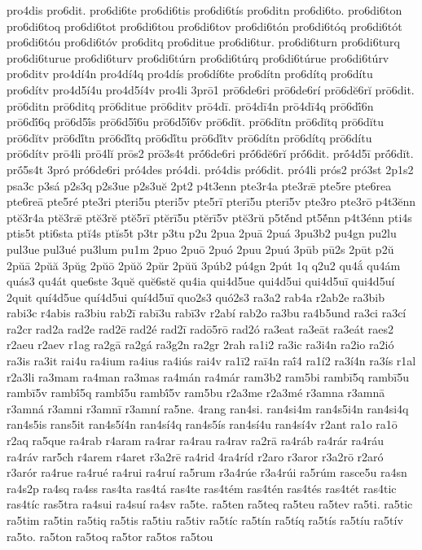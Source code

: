 {pro4dis
pro6dit.
pro6di6te
pro6di6tis
pro6di6tís
pro6ditn
pro6di6to.
pro6di6ton
pro6di6toq
pro6di6tot
pro6di6tou
pro6di6tov
pro6di6tón
pro6di6tóq
pro6di6tót
pro6di6tóu
pro6di6tóv
pro6ditq
pro6ditue
pro6di6tur.
pro6di6turn
pro6di6turq
pro6di6turue
pro6di6turv
pro6di6túrn
pro6di6túrq
pro6di6túrue
pro6di6túrv
pro6ditv
pro4dí4n
pro4dí4q
pro4dís
pro6dí6te
pro6dítn
pro6dítq
pro6dítu
pro6dítv
pro4d5í4u
pro4d5í4v
pro4li
3prō1
prō6de6ri
prō6de6rí
prō6dĕ6rĭ
prō6dit.
prō6ditn
prō6ditq
prō6ditue
prō6ditv
prō4dī.
prō4dī4n
prō4dī4q
prō6dī́6n
prō6dī́6q
prō6d5ī́s
prō6d5ī́6u
prō6d5ī́6v
prō6dĭt.
prō6dĭtn
prō6dĭtq
prō6dĭtu
prō6dĭtv
prō6dĭ́tn
prō6dĭ́tq
prō6dĭ́tu
prō6dĭ́tv
prō6dítn
prō6dítq
prō6dítu
prō6dítv
prō4li
prō4lĭ
prōs2
prō3s4t
prṓ6de6ri
prṓ6dĕ6rĭ
prṓ6dit.
prṓ4d5ī
prṓ6dĭt.
prṓ5s4t
3pró
pró6de6ri
pró4des
pró4di.
pró4dis
pró6dit.
pró4li
prós2
pró3st
2p1s2
psa3c
p3sá
p2s3q
p2s3ue
p2s3uĕ
2pt2
p4t3enn
pte3r4a
pte3rǣ
pte5re
pte6rea
pte6reā
pte5ré
pte3ri
pteri5u
pteri5v
pte5rī
pterī5u
pterī5v
pte3ro
pte3rō
p4t3ĕnn
ptĕ3r4a
ptĕ3rǣ
ptĕ3rĕ
ptĕ5rī
ptĕrī5u
ptĕrī5v
ptĕ3rŭ
p5tĕ́nd
pt5ĕ́nn
p4t3énn
pti4s
ptis5t
pti6sta
ptĭ4s
ptĭs5t
p3tr
p3tu
p2u
2pua
2puā
2puá
3pu3b2
pu4gn
pu2lu
pul3ue
pul3ué
pu3lum
pu1m
2puo
2puō
2puó
2puu
2puú
3pūb
pū2s
2pūt
p2ŭ
2pŭā
2pŭă
3pŭg
2pŭō
2pŭŏ
2pŭr
2pŭŭ
3púb2
pú4gn
2pút
1q
q2u2
qu4ắ
qu4ám
quás3
qu4át
que6ste
3quĕ
quĕ6stĕ
qu4ia
qui4d5ue
qui4d5ui
qui4d5uī
qui4d5uí
2quit
quí4d5ue
quí4d5ui
quí4d5uī
quo2s3
quó2s3
ra3a2
rab4a
r2ab2e
ra3bib
rabi3c
r4abis
ra3biu
rab2ī
rabī3u
rabī3v
r2abí
rab2o
ra3bu
ra4b5und
ra3ci
ra3cí
ra2cr
rad2a
rad2e
rad2ē
rad2é
rad2ī
radō5rō
rad2ó
ra3eat
ra3eāt
ra3eát
raes2
r2aeu
r2aev
r1ag
ra2gā
ra2gá
ra3g2n
ra2gr
2rah
ra1i2
ra3ic
ra3i4n
ra2io
ra2ió
ra3is
ra3it
rai4u
ra4ium
ra4ius
ra4iús
rai4v
ra1ī2
raī4n
raī́4
ra1í2
ra3í4n
ra3ís
r1al
r2a3li
ra3mam
ra4man
ra3mas
ra4mán
ra4már
ram3b2
ram5bi
rambī5q
rambī5u
rambī5v
rambī́5q
rambī́5u
rambī́5v
ram5bu
r2a3me
r2a3mé
r3amna
r3amnā
r3amná
r3amni
r3amnī
r3amní
ra5ne.
4rang
ran4si.
ran4si4m
ran4s5i4n
ran4si4q
ran4s5is
rans5it
ran4s5í4n
ran4sí4q
ran4s5ís
ran4sí4u
ran4sí4v
r2ant
ra1o
ra1ō
r2aq
ra5que
ra4rab
r4aram
ra4rar
ra4rau
ra4rav
ra2rā
ra4ráb
ra4rár
ra4ráu
ra4ráv
rar5ch
r4arem
r4aret
r3a2rē
ra4rid
4ra4ríd
r2aro
r3aror
r3a2rō
r2aró
r3arór
ra4rue
ra4rué
ra4rui
ra4ruí
ra5rum
r3a4rúe
r3a4rúi
ra5rúm
rasce5u
ra4sn
ra4s2p
ra4sq
ra4ss
ras4ta
ras4tá
ras4te
ras4tém
ras4tén
ras4tés
ras4tét
ras4tic
ras4tíc
ras5tra
ra4sui
ra4suí
ra4sv
ra5te.
ra5ten
ra5teq
ra5teu
ra5tev
ra5ti.
ra5tic
ra5tim
ra5tin
ra5tiq
ra5tis
ra5tiu
ra5tiv
ra5tíc
ra5tín
ra5tíq
ra5tís
ra5tíu
ra5tív
ra5to.
ra5ton
ra5toq
ra5tor
ra5tos
ra5tou
}
